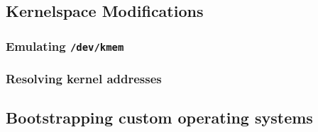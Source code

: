 \subsection{Kernelspace Modifications}

\subsubsection{Emulating \texttt{/dev/kmem}}

\subsubsection{Resolving kernel addresses}





\subsection{Bootstrapping custom operating systems}


